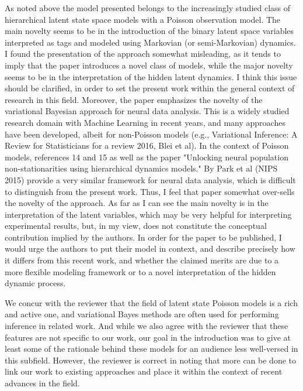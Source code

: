 \documentclass[12pt,a4paper]{article}
\newcommand{\edit}[1]{\textcolor{edit}{#1}}
\begin{document}
As noted above the model presented belongs to the increasingly studied class of hierarchical latent state space models with a Poisson observation model. The main novelty seems to be in the introduction of the binary latent space variables interpreted as tags and modeled using Markovian (or semi-Markovian) dynamics. I found the presentation of the approach somewhat misleading, as it tends to imply that the paper introduces a novel class of models, while the major novelty seems to be in the interpretation of the hidden latent dynamics. I think this issue should be clarified, in order to set the present work within the general context of research in this field. Moreover, the paper emphasizes the novelty of the variational Bayesian approach for neural data analysis. This is a widely studied research domain with Machine Learning in recent years, and many approaches have been developed, albeit for non-Poisson models (e.g., Variational Inference: A Review for Statisticians for a review 2016, Blei et al). In the context of Poisson models, references 14 and 15 as well as the paper "Unlocking neural population non-stationarities using hierarchical dynamics models." By Park et al (NIPS 2015) provide a very similar framework for neural data analysis, which is difficult to distinguish from the present work. Thus, I feel that paper somewhat over-sells the novelty of the approach. As far as I can see the main novelty is in the interpretation of the latent variables, which may be very helpful for interpreting experimental results, but, in my view, does not constitute the conceptual contribution implied by the authors. In order for the paper to be published, I would urge the authors to put their model in context, and describe precisely how it differs from this recent work, and whether the claimed merits are due to a more flexible modeling framework or to a novel interpretation of the hidden dynamic process.

\edit{
We concur with the reviewer that the field of latent state Poisson models is a rich and active one, and variational Bayes methods are often used for performing inference in related work. And while we also agree with the reviewer that these features are not specific to our work, our goal in the introduction was to give at least some of the rationale behind these models for an audience less well-versed in this subfield. However, the reviewer is correct in noting that more can be done to link our work to existing approaches and place it within the context of recent advances in the field.
}
\end{document}
